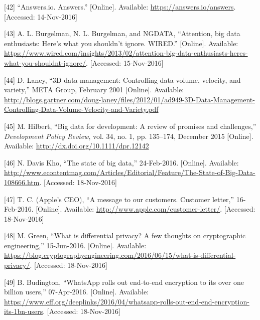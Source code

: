 \documentclass[12pt,english,a4paper,titlepage,cleardoublepage=empty,dottedtoc]{report}
\begin{document}
\hypertarget{ref-web_2016_answers-io}{}
{[}42{]} ``Answers.io. Answers.'' {[}Online{]}. Available:
\url{https://answers.io/answers}. {[}Accessed: 14-Nov-2016{]}

\hypertarget{ref-web_2016_big-data-enthusiasts-should-not-ignore}{}
{[}43{]} A. L. Burgelman, N. L. Burgelman, and NGDATA, ``Attention, big
data enthusiasts: Here's what you shouldn't ignore. WIRED.''
{[}Online{]}. Available:
\url{https://www.wired.com/insights/2013/02/attention-big-data-enthusiasts-heres-what-you-shouldnt-ignore/}.
{[}Accessed: 15-Nov-2016{]}

\hypertarget{ref-report_2001_3d-data-management-controlling-data-volume-velocity-and-variety}{}
{[}44{]} D. Laney, ``3D data management: Controlling data volume,
velocity, and variety,'' META Group, February 2001 {[}Online{]}.
Available:
\url{http://blogs.gartner.com/doug-laney/files/2012/01/ad949-3D-Data-Management-Controlling-Data-Volume-Velocity-and-Variety.pdf}

\hypertarget{ref-paper_2015_big-data-for-development-a-review-of-promises-and-challenges:more-data}{}
{[}45{]} M. Hilbert, ``Big data for development: A review of promises
and challenges,'' \emph{Development Policy Review}, vol. 34, no. 1, pp.
135--174, December 2015 {[}Online{]}. Available:
\url{http://dx.doi.org/10.1111/dpr.12142}

\hypertarget{ref-web_2016_the-state-of-big-data}{}
{[}46{]} N. Davis Kho, ``The state of big data,'' 24-Feb-2016.
{[}Online{]}. Available:
\url{http://www.econtentmag.com/Articles/Editorial/Feature/The-State-of-Big-Data-108666.htm}.
{[}Accessed: 18-Nov-2016{]}

\hypertarget{ref-web_2016_apple_customer-letter}{}
{[}47{]} T. C. (Apple's CEO), ``A message to our customers. Customer
letter,'' 16-Feb-2016. {[}Online{]}. Available:
\url{http://www.apple.com/customer-letter/}. {[}Accessed: 18-Nov-2016{]}

\hypertarget{ref-web_2016_what-is-differential-privacy}{}
{[}48{]} M. Green, ``What is differential privacy? A few thoughts on
cryptographic engineering,'' 15-Jun-2016. {[}Online{]}. Available:
\url{https://blog.cryptographyengineering.com/2016/06/15/what-is-differential-privacy/}.
{[}Accessed: 18-Nov-2016{]}

\hypertarget{ref-web_2016_eff_whatsapp-rolls-out-emd-to-end-encryption}{}
{[}49{]} B. Budington, ``WhatsApp rolls out end-to-end encryption to its
over one billion users,'' 07-Apr-2016. {[}Online{]}. Available:
\url{https://www.eff.org/deeplinks/2016/04/whatsapp-rolls-out-end-end-encryption-its-1bn-users}.
{[}Accessed: 18-Nov-2016{]}
\end{document}
